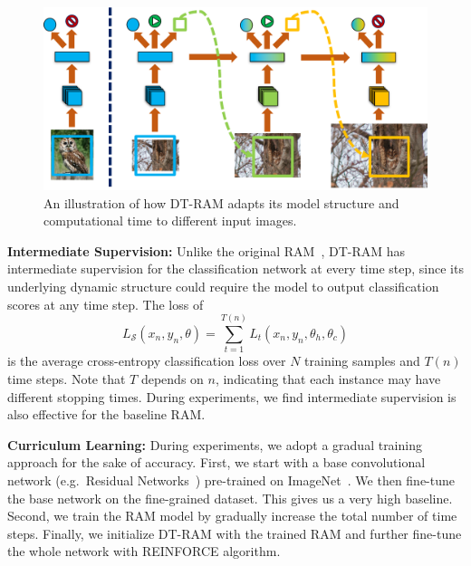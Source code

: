 \documentclass[10pt,twocolumn,letterpaper]{article}
\begin{document}
\setlength{\tabcolsep}{1pt}
\begin{figure}
\begin{center}
    \includegraphics[width=0.95\linewidth]{figs/model/dynamic_ram_inference}
\end{center}
\caption{An illustration of how DT-RAM adapts its model structure and computational time to different input images.}
\label{fig:DT-RAM-illustration}
\end{figure}

{\bf Intermediate Supervision:} Unlike the original RAM~\cite{mnih2014recurrent}, DT-RAM has intermediate supervision for the classification network at every time step, since its underlying dynamic structure could require the model to output classification scores at any time step. The loss of
\begin{equation}
  L_{\mathcal{S}}(x_n, y_n, \theta) = \sum_{t=1}^{T(n)} L_t(x_n, y_n, \theta_h, \theta_c)
\end{equation}
is the average cross-entropy classification loss over $N$ training samples and $T(n)$ time steps.
Note that $T$ depends on $n$, indicating that each instance may have different stopping times.
During experiments, we find intermediate supervision is also effective for the baseline RAM.

{\bf Curriculum Learning:} During experiments, we adopt a gradual training approach for the sake of accuracy.
First, we start with a base convolutional network (e.g.\ Residual Networks~\cite{he2016deep}) pre-trained on ImageNet~\cite{deng2009imagenet}.
We then fine-tune the base network on the fine-grained dataset.
This gives us a very high baseline.
Second, we train the RAM model by gradually increase the total number of time steps.
Finally, we initialize DT-RAM with the trained RAM and further fine-tune the whole network with REINFORCE algorithm.

\end{document}
